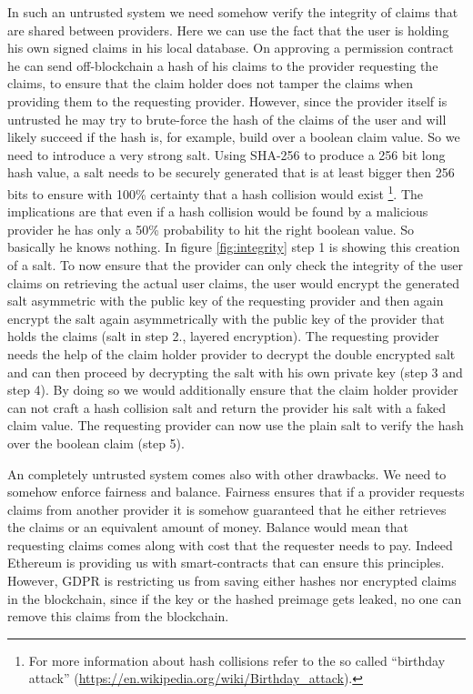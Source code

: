 In such an untrusted system we need somehow verify the integrity of claims that are shared between providers.
Here we can use the fact that the user is holding his own signed claims in his local database.
On approving a permission contract he can send off-blockchain a hash of his claims to the provider requesting the claims,
to ensure that the claim holder does not tamper the claims when providing them to the requesting provider.
However, since the provider itself is untrusted he may try to brute-force the hash of the claims of the user and will
likely succeed if the hash is, for example, build over a boolean claim value. So we need to introduce a very strong salt.
Using SHA-256 to produce a 256 bit long hash value, a salt needs to be securely generated that is at least bigger
then 256 bits to ensure with 100\% certainty that a hash collision would exist
\footnote{For more information about hash collisions refer to the so called “birthday attack”
(\url{https://en.wikipedia.org/wiki/Birthday_attack}).}.
The implications are that even if a hash collision would be found by a malicious provider he has only a
50\% probability to hit the right boolean value. So basically he knows nothing. In figure \ref{fig:integrity}
step 1 is showing this creation of a salt. To now ensure that the provider can only check the integrity of
the user claims on retrieving the actual user claims, the user would encrypt the generated salt asymmetric with
the public key of the requesting provider and then again encrypt the salt again asymmetrically with the public key of
the provider that holds the claims (salt in step 2., layered encryption). The requesting provider needs the help of the
claim holder provider to decrypt the double encrypted salt and can then proceed by decrypting the salt with his own
private key (step 3 and step 4). By doing so we would additionally ensure that the claim holder provider can not craft
a hash collision salt and return the provider his salt with a faked claim value.  The requesting provider can now use
the plain salt to verify the hash over the boolean claim (step 5).

An completely untrusted system comes also with other drawbacks. We need to somehow enforce fairness and balance. Fairness ensures that if a provider requests claims from another provider it is somehow guaranteed that he either retrieves the claims or an equivalent amount of money. Balance would mean that requesting claims comes along with cost that the requester needs to pay. Indeed Ethereum is providing us with smart-contracts that can ensure this principles. However, GDPR is restricting us from saving either hashes nor encrypted claims in the blockchain, since if the key or the hashed preimage gets leaked, no one can remove this claims from the blockchain.


